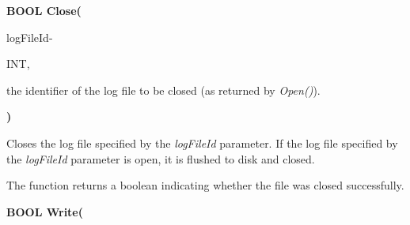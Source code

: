 \bigskip
\textbf{BOOL Close(}

\hfill
\begin{minipage}{\dimexpr\textwidth-2em}
    \medskip
    \begin{minipage}[t][][b]{9.5em}logFileId\hfill{-}\end{minipage}
        \begin{minipage}[t][][b]{5.5em}INT,\hfill\end{minipage}
    \begin{minipage}[t][][b]{\dimexpr\textwidth-15.5em}
        the identifier of the log file to be closed (as returned by \textit{Open()}).
    \end{minipage}\vfill
\end{minipage}

\textbf{)}

\medskip
Closes the log file specified by the \textit{logFileId} parameter.  If the log file specified by the \textit{logFileId} parameter is open, it is flushed to disk and closed.

The function returns a boolean indicating whether the file was closed successfully.

\bigskip
\textbf{BOOL Write(}

